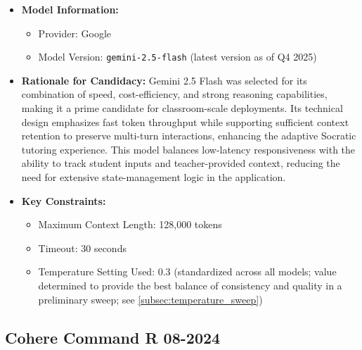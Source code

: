 \begin{itemize}
    \item \textbf{Model Information:} 
        \begin{itemize}
            \item Provider: Google
            \item Model Version: \verb|gemini-2.5-flash| (latest version as of Q4 2025)
        \end{itemize}
    \item \textbf{Rationale for Candidacy:} 
        Gemini 2.5 Flash was selected for its combination of speed, cost-efficiency, and strong reasoning capabilities, making it a prime candidate for classroom-scale deployments. Its technical design emphasizes fast token throughput while supporting sufficient context retention to preserve multi-turn interactions, enhancing the adaptive Socratic tutoring experience. This model balances low-latency responsiveness with the ability to track student inputs and teacher-provided context, reducing the need for extensive state-management logic in the application.
    \item \textbf{Key Constraints:}
        \begin{itemize}
            \item Maximum Context Length: 128,000 tokens
            \item Timeout: 30 seconds
            \item Temperature Setting Used: 0.3 (standardized across all models; value determined to provide the best balance of consistency and quality in a preliminary sweep; see \cref{subsec:temperature_sweep})
        \end{itemize}
\end{itemize}

\subsection{Cohere Command R 08-2024}
\label{sec:model_command_r}

